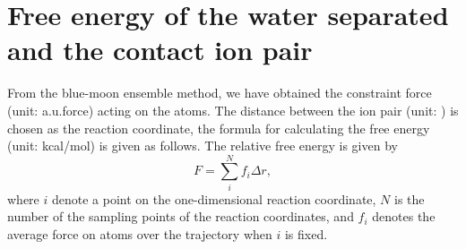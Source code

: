 \section{Free energy of the water separated and the contact ion pair}\label{calculate_free_energy} 
From the blue-moon ensemble method\cite{Carter1989,Sprik1998}, we have obtained the constraint force (unit: a.u.force) acting on the atoms. 
The distance between the ion pair (unit: \A) is chosen as the reaction coordinate, the formula for calculating the free energy (unit: kcal/mol) is given as follows.
The relative free energy is given by
\begin{equation}
  F = \sum_{i}^{N}f_i{\Delta{r}},\nonumber
  \label{eq:f-e}
\end{equation}
where $i$ denote a point on the one-dimensional reaction coordinate, 
$N$ is the number of the sampling points of the reaction coordinates,
and $f_i$ denotes the average force on atoms over the trajectory when $i$ is fixed. 
